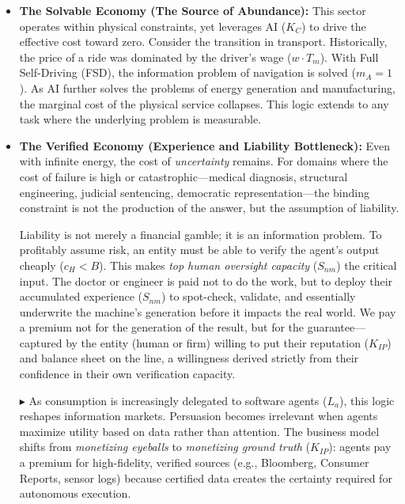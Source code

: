 \documentclass[12pt, letter]{article}
\begin{document}
\begin{itemize}
    \item \textbf{The Solvable Economy (The Source of Abundance):} This sector operates within physical constraints, yet leverages AI ($K_C$) to drive the effective cost toward zero. Consider the transition in transport. Historically, the price of a ride was dominated by the driver's wage ($w \cdot T_m$). With Full Self-Driving (FSD), the information problem of navigation is solved ($m_A=1$). As AI further solves the problems of energy generation and manufacturing, the marginal cost of the physical service collapses. This logic extends to any task where the underlying problem is measurable.

    \item \textbf{The Verified Economy (Experience and Liability Bottleneck):} Even with infinite energy, the cost of \textit{uncertainty} remains. For domains where the cost of failure is high or catastrophic---medical diagnosis, structural engineering, judicial sentencing, democratic representation---the binding constraint is not the production of the answer, but the assumption of liability.

    Liability is not merely a financial gamble; it is an information problem. To profitably assume risk, an entity must be able to verify the agent's output cheaply ($c_H < B$). This makes \emph{top human oversight capacity} ($S_{nm}$) the critical input. The doctor or engineer is paid not to do the work, but to deploy their accumulated experience ($S_{nm}$) to spot-check, validate, and essentially underwrite the machine's generation before it impacts the real world. We pay a premium not for the generation of the result, but for the guarantee---captured by the entity (human or firm) willing to put their reputation ($K_{IP}$) and balance sheet on the line, a willingness derived strictly from their confidence in their own verification capacity.

    $\blacktriangleright$ As consumption is increasingly delegated to software agents ($L_a$), this logic reshapes information markets. Persuasion becomes irrelevant when agents maximize utility based on data rather than attention. The business model shifts from \emph{monetizing eyeballs} to \emph{monetizing ground truth} ($K_{IP}$): agents pay a premium for high-fidelity, verified sources (e.g., Bloomberg, Consumer Reports, sensor logs) because certified data creates the certainty required for autonomous execution.


\end{itemize}
\end{document}
